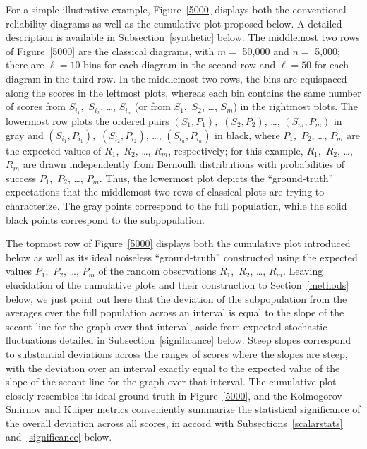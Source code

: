 \documentclass{article}
\begin{document}
For a simple illustrative example,
Figure~\ref{5000} displays both the conventional reliability diagrams
as well as the cumulative plot proposed below.
A detailed description is available in Subsection~\ref{synthetic} below.
The middlemost two rows of Figure~\ref{5000} are the classical diagrams,
with $m =$ 50,000 and $n =$ 5,000;
there are $\ell = 10$ bins for each diagram in the second row
and $\ell = 50$ for each diagram in the third row.
In the middlemost two rows, the bins are equispaced along the scores
in the leftmost plots, whereas each bin contains the same number of scores
from $S_{i_1}$,~$S_{i_2}$, \dots, $S_{i_n}$
(or from $S_1$,~$S_2$, \dots, $S_m$) in the rightmost plots.
The lowermost row plots the ordered pairs
$(S_1, P_1)$,~$(S_2, P_2)$, \dots, $(S_m, P_m)$ in gray and
$(S_{i_1}, P_{i_1})$,~$(S_{i_2}, P_{i_2})$, \dots, $(S_{i_n}, P_{i_n})$
in black, where $P_1$,~$P_2$, \dots, $P_m$ are the expected values
of $R_1$,~$R_2$, \dots, $R_m$, respectively;
for this example, $R_1$,~$R_2$, \dots, $R_m$ are drawn independently
from Bernoulli distributions with probabilities of success
$P_1$,~$P_2$, \dots, $P_m$.
Thus, the lowermost plot depicts the ``ground-truth'' expectations
that the middlemost two rows of classical plots are trying to characterize.
The gray points correspond to the full population,
while the solid black points correspond to the subpopulation.

The topmost row of Figure~\ref{5000} displays both
the cumulative plot introduced below as well as its ideal noiseless
``ground-truth'' constructed using the expected values
$P_1$,~$P_2$, \dots, $P_m$ of the random observations
$R_1$,~$R_2$, \dots, $R_m$.
Leaving elucidation of the cumulative plots and their construction
to Section~\ref{methods} below,
we just point out here that the deviation of the subpopulation
from the averages over the full population across an interval
is equal to the slope of the secant line for the graph over that interval,
aside from expected stochastic fluctuations
detailed in Subsection~\ref{significance} below.
Steep slopes correspond to substantial deviations across the ranges of scores
where the slopes are steep, with the deviation over an interval exactly equal
to the expected value of the slope of the secant line for the graph
over that interval. The cumulative plot closely resembles
its ideal ground-truth in Figure~\ref{5000},
and the Kolmogorov-Smirnov and Kuiper metrics conveniently summarize
the statistical significance of the overall deviation across all scores,
in accord with Subsections~\ref{scalarstats} and~\ref{significance} below.
\end{document}
